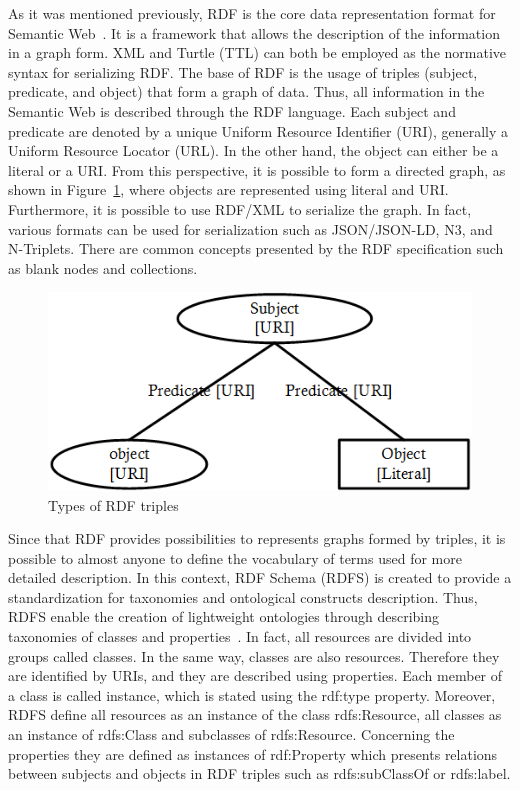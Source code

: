 As it was mentioned previously, RDF is the core data representation format for Semantic Web~\cite{thesis}. It is a framework that allows the description of the information in a graph form. XML and Turtle (TTL) can both be employed as the normative syntax for serializing RDF. The base of RDF is the usage of triples (subject, predicate, and object) that form a graph of data. Thus, all information in the Semantic Web is described through the RDF language. Each subject and predicate are denoted by a unique Uniform Resource Identifier (URI), generally a Uniform Resource Locator (URL). In the other hand, the object can either be a literal or a URI. From this perspective, it is possible to form a directed graph, as shown in Figure~\ref{fig:contrib2:rdf}, where objects are represented using literal and URI. Furthermore, it is possible to use RDF/XML to serialize the graph. In fact, various formats can be used for serialization such as JSON/JSON-LD, N3, and N-Triplets. There are common concepts presented by the RDF specification such as blank nodes and collections.
\begin{figure}[htbp]
    \centering
    \includegraphics[width=.5\textwidth]{resources/images/rdf}
    \caption{Types of RDF triples}\label{fig:contrib2:rdf}
\end{figure}
Since that RDF provides possibilities to represents graphs formed by triples, it is possible to almost anyone to define the vocabulary of terms used for more detailed description. In this context, RDF Schema (RDFS) is created to provide a standardization for taxonomies and ontological constructs description. Thus, RDFS enable the creation of lightweight ontologies through describing taxonomies of classes and properties~\cite{rdfs}. In fact, all resources are divided into groups called classes. In the same way, classes are also resources. Therefore they are identified by URIs, and they are described using properties. Each member of a class is called instance, which is stated using the rdf:type property. Moreover, RDFS define all resources as an instance of the class rdfs:Resource, all classes as an instance of rdfs:Class and subclasses of rdfs:Resource. Concerning the properties they are defined as instances of rdf:Property which presents relations between subjects and objects in RDF triples such as rdfs:subClassOf or rdfs:label. \par

